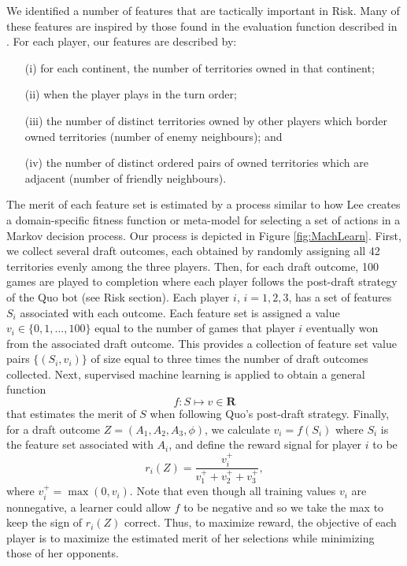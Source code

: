 \documentclass[letterpaper]{article}
\numberwithin{equation}{section}
\numberwithin{theorem}{section}
\numberwithin{lemma}{section}
\numberwithin{df}{section}
\begin{document}
We identified a number of features that are tactically important in Risk.  Many of these features are inspired by those found in the evaluation function described in \cite{RiskBots}.  For each player, our features are described by:
\begin{itemize}
	\item[(i)] for each continent, the number of territories owned in that continent;
	\item[(ii)] when the player plays in the turn order;
	\item[(iii)] the number of distinct territories owned by other players which border owned territories (number of enemy neighbours); and
	\item[(iv)] the number of distinct ordered pairs of owned territories which are adjacent (number of friendly neighbours).
\end{itemize}
The merit of each feature set is estimated by a process similar to how Lee \cite{GregLeeThesis} creates a domain-specific fitness function or meta-model for selecting a set of actions in a Markov decision process.  Our process is depicted in Figure \ref{fig:MachLearn}.  First, we collect several draft outcomes, each obtained by randomly assigning all 42 territories evenly among the three players.  Then, for each draft outcome, 100 games are played to completion where each player follows the post-draft strategy of the Quo bot (see Risk section).  Each player $i$, $i=1,2,3$, has a set of features $S_i$ associated with each outcome.  Each feature set is assigned a value $v_i \in \{0,1,...,100\}$ equal to the number of games that player $i$ eventually won from the associated draft outcome.  This provides a collection of feature set value pairs $\{(S_i, v_i)\}$ of size equal to three times the number of draft outcomes collected.  Next, supervised machine learning is applied to obtain a general function
\[ f: S \mapsto v \in \textbf{R} \] 
that estimates the merit of $S$ when following Quo's post-draft strategy.  Finally, for a draft outcome $Z = (A_1,A_2,A_3,\phi)$, we calculate $v_i = f(S_i)$ where $S_i$ is the feature set associated with $A_i$, and define the reward signal for player $i$ to be
\[ r_i(Z) = \frac{v_i^+}{v_1^+ + v_2^+ + v_3^+}, \]
where $v_i^+ = \max(0, v_i)$.  Note that even though all training values $v_i$ are nonnegative, a learner could allow $f$ to be negative and so we take the max to keep the sign of $r_i(Z)$ correct.  Thus, to maximize reward, the objective of each player is to maximize the estimated merit of her selections while minimizing those of her opponents.
\end{document}
